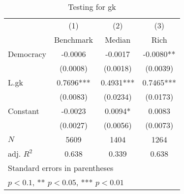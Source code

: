 \begin{table}[htbp]\centering
\def\sym#1{\ifmmode^{#1}\else\(^{#1}\)\fi}
\caption{Testing for gk \label{tab:regression5}}
\begin{tabular}{l*{3}{c}}
\hline\hline
            &\multicolumn{1}{c}{(1)}&\multicolumn{1}{c}{(2)}&\multicolumn{1}{c}{(3)}\\
            &\multicolumn{1}{c}{Benchmark}&\multicolumn{1}{c}{Median}&\multicolumn{1}{c}{Rich}\\
\hline
Democracy   &     -0.0006   &     -0.0017   &     -0.0080** \\
            &    (0.0008)   &    (0.0018)   &    (0.0039)   \\
[1em]
L.gk        &      0.7696***&      0.4931***&      0.7465***\\
            &    (0.0083)   &    (0.0234)   &    (0.0173)   \\
[1em]
Constant    &     -0.0023   &      0.0094*  &      0.0083   \\
            &    (0.0027)   &    (0.0056)   &    (0.0073)   \\
\hline
\(N\)       &        5609   &        1404   &        1264   \\
adj. \(R^{2}\)&       0.638   &       0.339   &       0.638   \\
\hline\hline
\multicolumn{4}{l}{\footnotesize Standard errors in parentheses}\\
\multicolumn{4}{l}{\footnotesize * \(p<0.1\), ** \(p<0.05\), *** \(p<0.01\)}\\
\end{tabular}
\end{table}
